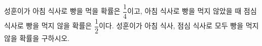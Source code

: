 성훈이가 아침 식사로 빵을 먹을 확률은 $\dfrac{1}{4}$이고, 아침 식사로 빵을 먹지 않았을 때 점심 식사로 빵을 먹지 않을 확률은 $\dfrac{1}{2}$이다. 성훈이가 아침 식사, 점심 식사로 모두 빵을 먹지 않을 확률을 구하시오.
